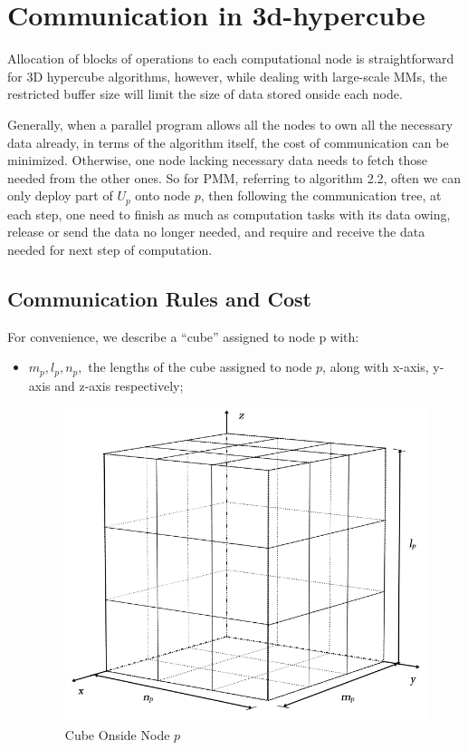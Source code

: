 \documentclass{amsart}
\theoremstyle{definition}
\theoremstyle{remark}
\numberwithin{equation}{section}
\begin{document}
\section{Communication in 3d-hypercube}
	Allocation of blocks of operations to each computational node is straightforward for 3D hypercube algorithms, however, while dealing with large-scale MMs, the restricted buffer size will limit the size of data stored onside each node.\par
	Generally, when a parallel program allows all the nodes to own all the necessary data already, in terms of the algorithm itself, the cost of communication can be minimized. Otherwise, one node lacking necessary data needs to fetch those needed from the other ones. So for PMM, referring to algorithm 2.2, often we can only deploy part of $U_p$ onto node $p$, then following the communication tree, at each step, one need to finish as much as computation tasks with its data owing, release or send the data no longer needed, and require and receive the data needed for next step of computation.\par


\subsection{Communication Rules and Cost}
For convenience, we describe a “cube” assigned to node p with:\par
\begin{itemize}
\item $m_p,l_p,n_p,$ the lengths of the cube assigned to node $p$, along with x-axis, y-axis and z-axis respectively;
\begin{figure}[h]
	\includegraphics[scale=0.45]{Figures/cube.jpg}
	\caption{Cube Onside Node $p$}
\end{figure}
\end{itemize}
\end{document}
